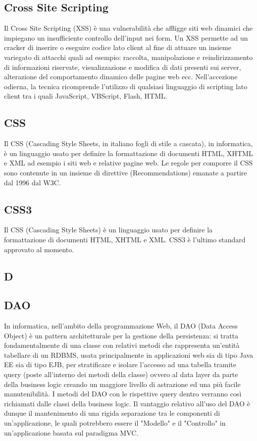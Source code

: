 \subsection{Cross Site Scripting}
Il Cross Site Scripting (XSS) è una vulnerabilità che affligge siti web dinamici che impiegano un insufficiente controllo dell'input nei form. Un XSS permette ad un cracker di inserire o eseguire codice lato client al fine di attuare un insieme variegato di attacchi quali ad esempio: raccolta, manipolazione e reindirizzamento di informazioni riservate, visualizzazione e modifica di dati presenti sui server, alterazione del comportamento dinamico delle pagine web ecc. Nell'accezione odierna, la tecnica ricomprende l'utilizzo di qualsiasi linguaggio di scripting lato client tra i quali JavaScript, VBScript, Flash, HTML.

\subsection{CSS}
Il CSS (Cascading Style Sheets, in italiano fogli di stile a cascata), in informatica, è un linguaggio usato per definire la formattazione di documenti HTML, XHTML e XML ad esempio i siti web e relative pagine web. Le regole per comporre il CSS sono contenute in un insieme di direttive (Recommendations) emanate a partire dal 1996 dal W3C.

\subsection{CSS3}
Il CSS (Cascading Style Sheets) è un linguaggio usato per definire la formattazione di documenti HTML, XHTML e XML.
CSS3 è l'ultimo standard approvato al momento.

\newpage

\begin{center}
\Huge\section{\uppercase{D}}
\end{center}

\subsection{DAO}
In informatica, nell'ambito della programmazione Web, il DAO (Data Access Object) è un pattern architetturale per la gestione della persistenza: si tratta fondamentalmente di una classe con relativi metodi che rappresenta un'entità tabellare di un RDBMS, usata principalmente in applicazioni web sia di tipo Java EE sia di tipo EJB, per stratificare e isolare l'accesso ad una tabella tramite query (poste all'interno dei metodi della classe) ovvero al data layer da parte della business logic creando un maggiore livello di astrazione ed una più facile manutenibilità. I metodi del DAO con le rispettive query dentro verranno così richiamati dalle classi della business logic. Il vantaggio relativo all'uso del DAO è dunque il mantenimento di una rigida separazione tra le componenti di un'applicazione, le quali potrebbero essere il "Modello" e il "Controllo" in un'applicazione basata sul paradigma MVC.

